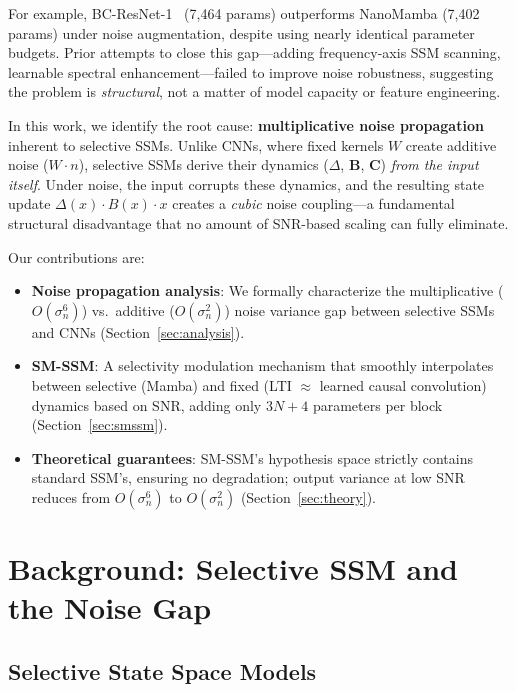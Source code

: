 \documentclass{Interspeech}
\begin{document}
For example, BC-ResNet-1~\cite{kim2021bcresnet} (7,464 params) outperforms NanoMamba (7,402 params) under noise augmentation, despite using nearly identical parameter budgets.
Prior attempts to close this gap---adding frequency-axis SSM scanning, learnable spectral enhancement---failed to improve noise robustness, suggesting the problem is \emph{structural}, not a matter of model capacity or feature engineering.

In this work, we identify the root cause: \textbf{multiplicative noise propagation} inherent to selective SSMs.
Unlike CNNs, where fixed kernels $W$ create additive noise ($W{\cdot}n$), selective SSMs derive their dynamics ($\Delta$, $\mathbf{B}$, $\mathbf{C}$) \emph{from the input itself}.
Under noise, the input corrupts these dynamics, and the resulting state update $\Delta(x){\cdot}B(x){\cdot}x$ creates a \emph{cubic} noise coupling---a fundamental structural disadvantage that no amount of SNR-based scaling can fully eliminate.

Our contributions are:
\begin{itemize}
\setlength\itemsep{0pt}
\item \textbf{Noise propagation analysis}: We formally characterize the multiplicative ($O(\sigma_n^6)$) vs.\ additive ($O(\sigma_n^2)$) noise variance gap between selective SSMs and CNNs (Section~\ref{sec:analysis}).
\item \textbf{SM-SSM}: A selectivity modulation mechanism that smoothly interpolates between selective (Mamba) and fixed (LTI $\approx$ learned causal convolution) dynamics based on SNR, adding only $3N{+}4$ parameters per block (Section~\ref{sec:smssm}).
\item \textbf{Theoretical guarantees}: SM-SSM's hypothesis space strictly contains standard SSM's, ensuring no degradation; output variance at low SNR reduces from $O(\sigma_n^6)$ to $O(\sigma_n^2)$ (Section~\ref{sec:theory}).
\end{itemize}

\section{Background: Selective SSM and the Noise Gap}
\label{sec:background}

\subsection{Selective State Space Models}
\end{document}
